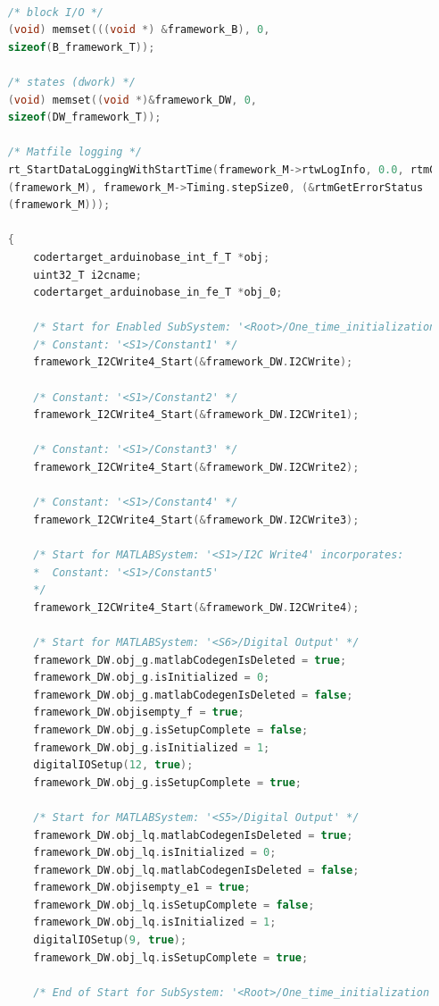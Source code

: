 	\begin{lstlisting}[caption={Automatically generated C code}, language=c,firstnumber=698,label={lst:acg3}]	
	
	/* block I/O */
	(void) memset(((void *) &framework_B), 0,
	sizeof(B_framework_T));
	
	/* states (dwork) */
	(void) memset((void *)&framework_DW, 0,
	sizeof(DW_framework_T));
	
	/* Matfile logging */
	rt_StartDataLoggingWithStartTime(framework_M->rtwLogInfo, 0.0, rtmGetTFinal
	(framework_M), framework_M->Timing.stepSize0, (&rtmGetErrorStatus
	(framework_M)));
	
	{
		codertarget_arduinobase_int_f_T *obj;
		uint32_T i2cname;
		codertarget_arduinobase_in_fe_T *obj_0;
		
		/* Start for Enabled SubSystem: '<Root>/One_time_initialization' */
		/* Constant: '<S1>/Constant1' */
		framework_I2CWrite4_Start(&framework_DW.I2CWrite);
		
		/* Constant: '<S1>/Constant2' */
		framework_I2CWrite4_Start(&framework_DW.I2CWrite1);
		
		/* Constant: '<S1>/Constant3' */
		framework_I2CWrite4_Start(&framework_DW.I2CWrite2);
		
		/* Constant: '<S1>/Constant4' */
		framework_I2CWrite4_Start(&framework_DW.I2CWrite3);
		
		/* Start for MATLABSystem: '<S1>/I2C Write4' incorporates:
		*  Constant: '<S1>/Constant5'
		*/
		framework_I2CWrite4_Start(&framework_DW.I2CWrite4);
		
		/* Start for MATLABSystem: '<S6>/Digital Output' */
		framework_DW.obj_g.matlabCodegenIsDeleted = true;
		framework_DW.obj_g.isInitialized = 0;
		framework_DW.obj_g.matlabCodegenIsDeleted = false;
		framework_DW.objisempty_f = true;
		framework_DW.obj_g.isSetupComplete = false;
		framework_DW.obj_g.isInitialized = 1;
		digitalIOSetup(12, true);
		framework_DW.obj_g.isSetupComplete = true;
		
		/* Start for MATLABSystem: '<S5>/Digital Output' */
		framework_DW.obj_lq.matlabCodegenIsDeleted = true;
		framework_DW.obj_lq.isInitialized = 0;
		framework_DW.obj_lq.matlabCodegenIsDeleted = false;
		framework_DW.objisempty_e1 = true;
		framework_DW.obj_lq.isSetupComplete = false;
		framework_DW.obj_lq.isInitialized = 1;
		digitalIOSetup(9, true);
		framework_DW.obj_lq.isSetupComplete = true;
		
		/* End of Start for SubSystem: '<Root>/One_time_initialization' */
		

\end{lstlisting}
